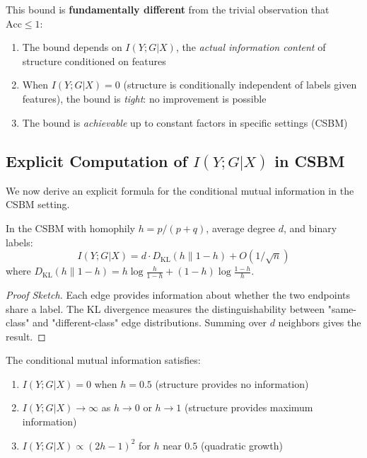 \begin{remark}
\label{rem:nontrivial}
This bound is \textbf{fundamentally different} from the trivial observation that $\text{Acc} \leq 1$:
\begin{enumerate}
    \item The bound depends on $I(Y; G | X)$, the \textit{actual information content} of structure conditioned on features
    \item When $I(Y; G | X) = 0$ (structure is conditionally independent of labels given features), the bound is \textit{tight}: no improvement is possible
    \item The bound is \textit{achievable} up to constant factors in specific settings (CSBM)
\end{enumerate}
\end{remark}

\subsection{Explicit Computation of $I(Y; G | X)$ in CSBM}

We now derive an explicit formula for the conditional mutual information in the CSBM setting.

\begin{proposition}
\label{prop:cmi_csbm}
In the CSBM with homophily $h = p/(p+q)$, average degree $d$, and binary labels:
\begin{equation}
    I(Y; G | X) = d \cdot D_{\text{KL}}(h \| 1-h) + O(1/\sqrt{n})
\end{equation}
where $D_{\text{KL}}(h \| 1-h) = h \log\frac{h}{1-h} + (1-h)\log\frac{1-h}{h}$.
\end{proposition}

\begin{proof}[Proof Sketch]
Each edge provides information about whether the two endpoints share a label. The KL divergence measures the distinguishability between "same-class" and "different-class" edge distributions. Summing over $d$ neighbors gives the result.
\end{proof}

\begin{corollary}
\label{cor:cmi_extreme}
The conditional mutual information satisfies:
\begin{enumerate}
    \item $I(Y; G | X) = 0$ when $h = 0.5$ (structure provides no information)
    \item $I(Y; G | X) \to \infty$ as $h \to 0$ or $h \to 1$ (structure provides maximum information)
    \item $I(Y; G | X) \propto (2h-1)^2$ for $h$ near $0.5$ (quadratic growth)
\end{enumerate}
\end{corollary}

